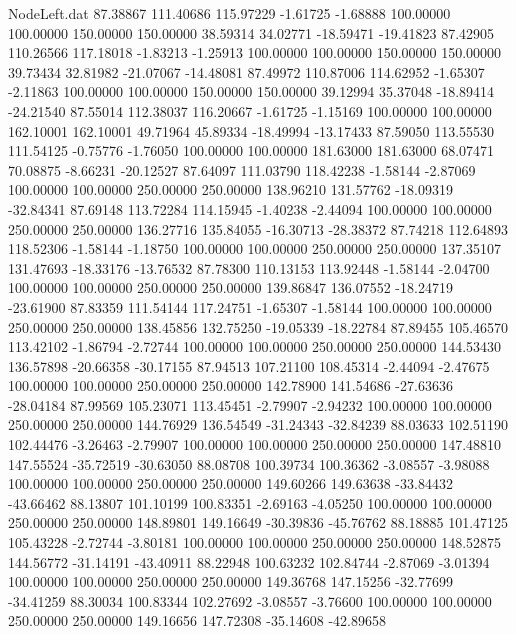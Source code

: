 \begin{filecontents}{NodeLeft.dat}
  87.38867  111.40686  115.97229    -1.61725   -1.68888  100.00000  100.00000  150.00000  150.00000   38.59314   34.02771  -18.59471  -19.41823
  87.42905  110.26566  117.18018    -1.83213   -1.25913  100.00000  100.00000  150.00000  150.00000   39.73434   32.81982  -21.07067  -14.48081
  87.49972  110.87006  114.62952    -1.65307   -2.11863  100.00000  100.00000  150.00000  150.00000   39.12994   35.37048  -18.89414  -24.21540
  87.55014  112.38037  116.20667    -1.61725   -1.15169  100.00000  100.00000  162.10001  162.10001   49.71964   45.89334  -18.49994  -13.17433
  87.59050  113.55530  111.54125    -0.75776   -1.76050  100.00000  100.00000  181.63000  181.63000   68.07471   70.08875   -8.66231  -20.12527
  87.64097  111.03790  118.42238    -1.58144   -2.87069  100.00000  100.00000  250.00000  250.00000  138.96210  131.57762  -18.09319  -32.84341
  87.69148  113.72284  114.15945    -1.40238   -2.44094  100.00000  100.00000  250.00000  250.00000  136.27716  135.84055  -16.30713  -28.38372
  87.74218  112.64893  118.52306    -1.58144   -1.18750  100.00000  100.00000  250.00000  250.00000  137.35107  131.47693  -18.33176  -13.76532
  87.78300  110.13153  113.92448    -1.58144   -2.04700  100.00000  100.00000  250.00000  250.00000  139.86847  136.07552  -18.24719  -23.61900
  87.83359  111.54144  117.24751    -1.65307   -1.58144  100.00000  100.00000  250.00000  250.00000  138.45856  132.75250  -19.05339  -18.22784
  87.89455  105.46570  113.42102    -1.86794   -2.72744  100.00000  100.00000  250.00000  250.00000  144.53430  136.57898  -20.66358  -30.17155
  87.94513  107.21100  108.45314    -2.44094   -2.47675  100.00000  100.00000  250.00000  250.00000  142.78900  141.54686  -27.63636  -28.04184
  87.99569  105.23071  113.45451    -2.79907   -2.94232  100.00000  100.00000  250.00000  250.00000  144.76929  136.54549  -31.24343  -32.84239
  88.03633  102.51190  102.44476    -3.26463   -2.79907  100.00000  100.00000  250.00000  250.00000  147.48810  147.55524  -35.72519  -30.63050
  88.08708  100.39734  100.36362    -3.08557   -3.98088  100.00000  100.00000  250.00000  250.00000  149.60266  149.63638  -33.84432  -43.66462
  88.13807  101.10199  100.83351    -2.69163   -4.05250  100.00000  100.00000  250.00000  250.00000  148.89801  149.16649  -30.39836  -45.76762
  88.18885  101.47125  105.43228    -2.72744   -3.80181  100.00000  100.00000  250.00000  250.00000  148.52875  144.56772  -31.14191  -43.40911
  88.22948  100.63232  102.84744    -2.87069   -3.01394  100.00000  100.00000  250.00000  250.00000  149.36768  147.15256  -32.77699  -34.41259
  88.30034  100.83344  102.27692    -3.08557   -3.76600  100.00000  100.00000  250.00000  250.00000  149.16656  147.72308  -35.14608  -42.89658

\end{filecontents}
